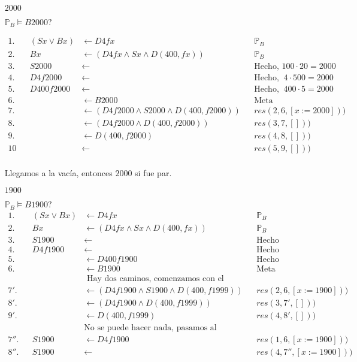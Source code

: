 \documentclass[8pt, letterpaper]{article}
\begin{document}
\begin{enumerate}
\begin{enumerate}
    \begin{itemize}
    \item[$2000$]

      \hfill\break
      $\mathbb{P}_B\models B2000?$
      
      \begin{align*}
        1.& & (Sx\lor Bx) &\leftarrow D4fx & &\mathbb{P}_B\\
        2.& & Bx &\leftarrow(D4fx \land Sx \land D(400,fx)) & &\mathbb{P}_B\\
        3.& & S2000&\leftarrow  & &\text{Hecho, }100\cdot 20 = 2000\\
        4.& & D4f2000&\leftarrow  & &\text{Hecho, } \ 4\cdot 500 = 2000\\
        5.& & D400f2000&\leftarrow  & &\text{Hecho, } \ 400\cdot 5 = 2000\\
        6.& & &\leftarrow  B2000 & &\text{Meta}\\
        7.& & &\leftarrow(D4f2000 \land S2000 \land D(400,f2000)) & &res(2, 6, [x:=2000]))\\
        8.& & &\leftarrow(D4f2000 \land D(400,f2000)) & &res(3, 7, []))\\
        9.& & &\leftarrow D(400,f2000) & &res(4, 8, []))\\
        10& & &\leftarrow   & &res(5, 9, []))\\
      \end{align*}

      Llegamos a la vacía, entonces $2000$ si fue par.
      \newpage
    \item[$1900$]
      
      \hfill\break
      $\mathbb{P}_B\models B1900?$
      \begin{align*}
        1.& & (Sx\lor Bx) &\leftarrow D4fx & &\mathbb{P}_B\\
        2.& & Bx &\leftarrow(D4fx \land Sx \land D(400,fx)) & &\mathbb{P}_B\\
        3.& & S1900&\leftarrow   & &\text{Hecho}\\
        4.& & D4f1900&\leftarrow  & &\text{Hecho}\\
        5.& & &\leftarrow D400f1900  & &\text{Hecho}\\
        6.& & &\leftarrow  B1900 & &\text{Meta}\\
        & &&\text{ Hay dos caminos, comenzamos con el primero:}\\
        7'.& & &\leftarrow(D4f1900 \land S1900 \land D(400,f1999)) & &res(2, 6, [x:=1900]))\\
        8'.& & &\leftarrow(D4f1900 \land D(400,f1999)) & &res(3, 7', []))\\
        9'.& & &\leftarrow D(400,f1999) & &res(4, 8', []))\\
        & &&\text{No se puede hacer nada, pasamos al segundo:}\\
        7''.& & S1900 &\leftarrow D4f1900 & &res(1, 6, [x:=1900]))\\
        8''.& & S1900 &\leftarrow  & &res(4, 7'', [x:=1900]))\\
      \end{align*}


\end{itemize}
\end{enumerate}
\end{enumerate}
\end{document}
